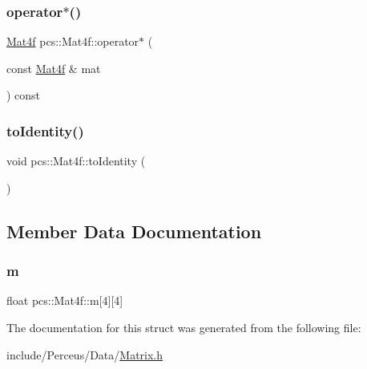 \mbox{\label{structpcs_1_1Mat4f_abf5cbb6f96fe61bbd09820868fe23cae}} 
\subsubsection{\texorpdfstring{operator$\ast$()}{operator*()}}
{\footnotesize\ttfamily \hyperlink{structpcs_1_1Mat4f}{Mat4f} pcs\+::\+Mat4f\+::operator$\ast$ (\begin{DoxyParamCaption}\item[{const \hyperlink{structpcs_1_1Mat4f}{Mat4f} \&}]{mat }\end{DoxyParamCaption}) const\hspace{0.3cm}{\ttfamily [inline]}}

\mbox{\label{structpcs_1_1Mat4f_af43fedb87b0bf46325895dd098ae4600}} 
\subsubsection{\texorpdfstring{to\+Identity()}{toIdentity()}}
{\footnotesize\ttfamily void pcs\+::\+Mat4f\+::to\+Identity (\begin{DoxyParamCaption}{ }\end{DoxyParamCaption})\hspace{0.3cm}{\ttfamily [inline]}}



\subsection{Member Data Documentation}
\mbox{\label{structpcs_1_1Mat4f_ad5835795f842580da5e36a70c39cc6c9}} 
\subsubsection{\texorpdfstring{m}{m}}
{\footnotesize\ttfamily float pcs\+::\+Mat4f\+::m\mbox{[}4\mbox{]}\mbox{[}4\mbox{]}}



The documentation for this struct was generated from the following file\+:\begin{DoxyCompactItemize}
\item 
include/\+Perceus/\+Data/\hyperlink{Matrix_8h}{Matrix.\+h}\end{DoxyCompactItemize}
